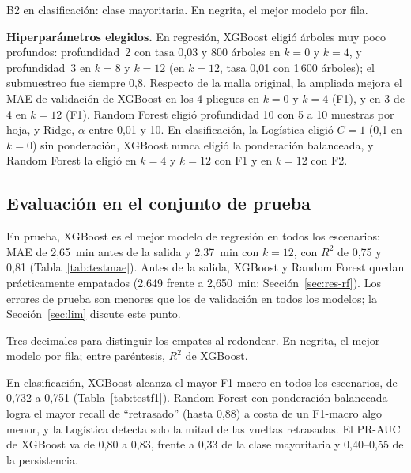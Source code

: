 \documentclass[conference]{IEEEtran}
\newcommand{\tablesize}{\fontsize{7}{8.4}\selectfont}
\newcommand{\ajustar}[1]{%
  \sbox{\tabbox}{#1}%
  \ifdim\wd\tabbox>\columnwidth
    \typeout{AVISO-TABLA: tabla mas ancha que la columna (\the\wd\tabbox\space > \the\columnwidth); se reduce}%
    \resizebox{\columnwidth}{!}{\usebox{\tabbox}}%
  \else
    \usebox{\tabbox}%
  \fi}
\newcommand{\tabla}[1]{\tablesize\setlength{\tabcolsep}{2pt}\ajustar{}}
\begin{document}
\begin{table}[!t]
\centering
\caption{F1-macro en validación cruzada (media $\pm$ desv. est.)}\label{tab:cvf1}
\tabla{t_cv_f1}

\vspace{2pt}\raggedright\scriptsize B2 en clasificación: clase mayoritaria. En negrita, el mejor modelo por fila.
\end{table}

\textbf{Hiperparámetros elegidos.} En regresión, XGBoost eligió árboles muy poco profundos: profundidad~2 con tasa 0,03 y 800 árboles en $k = 0$ y $k = 4$, y profundidad~3 en $k = 8$ y $k = 12$ (en $k = 12$, tasa 0,01 con 1\,600 árboles); el submuestreo fue siempre 0,8. Respecto de la malla original, la ampliada mejora el MAE de validación de XGBoost en los 4 pliegues en $k = 0$ y $k = 4$ (F1), y en 3 de 4 en $k = 12$ (F1). Random Forest eligió profundidad 10 con 5 a 10 muestras por hoja, y Ridge, $\alpha$ entre 0,01 y 10. En clasificación, la Logística eligió $C = 1$ (0,1 en $k = 0$) sin ponderación, XGBoost nunca eligió la ponderación balanceada, y Random Forest la eligió en $k = 4$ y $k = 12$ con F1 y en $k = 12$ con F2.

\subsection{Evaluación en el conjunto de prueba}
En prueba, XGBoost es el mejor modelo de regresión en todos los escenarios: MAE de 2,65~min antes de la salida y 2,37~min con $k = 12$, con $R^2$ de 0,75 y 0,81 (Tabla~\ref{tab:testmae}). Antes de la salida, XGBoost y Random Forest quedan prácticamente empatados (2,649 frente a 2,650~min; Sección~\ref{sec:res-rf}). Los errores de prueba son menores que los de validación en todos los modelos; la Sección~\ref{sec:lim} discute este punto.

\begin{table}[!t]
\centering
\caption{MAE (min) en el conjunto de prueba}\label{tab:testmae}
\tabla{t_test_mae}

\vspace{2pt}\raggedright\scriptsize Tres decimales para distinguir los empates al redondear. En negrita, el mejor modelo por fila; entre paréntesis, $R^2$ de XGBoost.
\end{table}

En clasificación, XGBoost alcanza el mayor F1-macro en todos los escenarios, de 0,732 a 0,751 (Tabla~\ref{tab:testf1}). Random Forest con ponderación balanceada logra el mayor recall de ``retrasado'' (hasta 0,88) a costa de un F1-macro algo menor, y la Logística detecta solo la mitad de las vueltas retrasadas. El PR-AUC de XGBoost va de 0,80 a 0,83, frente a 0,33 de la clase mayoritaria y 0,40--0,55 de la persistencia.
\end{document}
